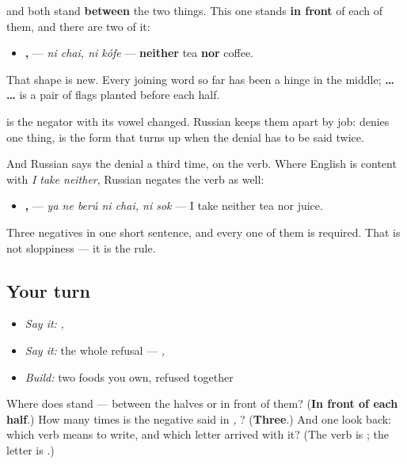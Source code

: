 \begin{grammarlens}[title={Grammar lens — the word that goes in front, twice}]
\textbf{} and \textbf{} both stand \textbf{between} the two things. This one stands \textbf{in front} of each of them, and there are two of it:

\begin{itemize}
\raggedright
  \item \textbf{ ,  } — \emph{ni chai, ni kófe} — \textbf{neither} tea \textbf{nor} coffee.
\end{itemize}

That shape is new. Every joining word so far has been a hinge in the middle; \textbf{ …  …} is a pair of flags planted before each half.

\textbf{} is the negator \textbf{} with its vowel changed. Russian keeps them apart by job: \textbf{} denies one thing, \textbf{} is the form that turns up when the denial has to be said twice.

And Russian says the denial a third time, on the verb. Where English is content with \emph{I take neither}, Russian negates the verb as well:

\begin{itemize}
\raggedright
  \item \textbf{    ,  } — \emph{ya ne berú ni chai, ni sok} — I take neither tea nor juice.
\end{itemize}

Three negatives in one short sentence, and every one of them is required. That is not sloppiness — it is the rule.
\end{grammarlens}

\subsection*{Your turn}
\begin{itemize}
\raggedright
  \item \emph{Say it:} \emph{ ,  }
  \item \emph{Say it:} the whole refusal — \emph{    ,  }
  \item \emph{Build:} two foods you own, refused together
\end{itemize}

\begin{tcolorbox}[breakable,colback=teal!4,colframe=teal!35!black,title={Before you move on}]
Where does \textbf{} stand — between the halves or in front of them? (\textbf{In front of each half}.) How many times is the negative said in \emph{    ,  }? (\textbf{Three}.) And one look back: which verb means to write, and which letter arrived with it? (The verb is \textbf{}; the letter is \textbf{}.)
\end{tcolorbox}

